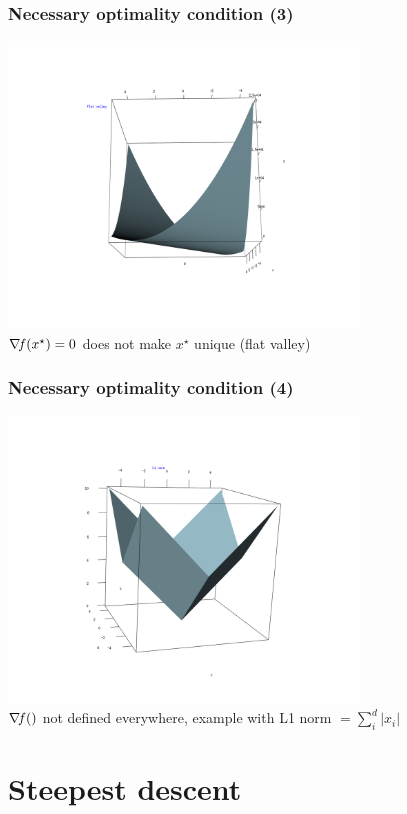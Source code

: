 \documentclass[12pt]{beamer}
\begin{document}
\begin{frame}
\frametitle{Necessary optimality condition (3)} 
\begin{center}
\includegraphics[width=0.7\textwidth]{flat_valley.png} \\
$\nabla\!{f}(x^\star) = 0$ does not make $x^\star$ unique (flat valley)
\end{center}
\end{frame}

\begin{frame}
\frametitle{Necessary optimality condition (4)} 
\begin{center}
\includegraphics[width=0.7\textwidth]{L1norm.png} \\
$\nabla\!{f}()$ not defined everywhere, example with L1 norm $= \sum_i^d \lvert x_i \rvert$
\end{center}
\end{frame}

\section{Steepest descent}
\end{document}
